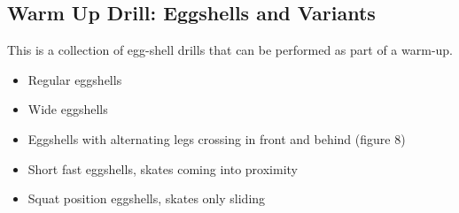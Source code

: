 \subsection*{Warm Up Drill: Eggshells and Variants}

This is a collection of egg-shell drills that can be performed as part of a warm-up. 

\begin{itemize}
    \item Regular eggshells  
    \item Wide eggshells
    \item Eggshells with alternating legs crossing in front and behind (figure 8) 
    \item Short fast eggshells, skates coming into proximity 
    \item Squat position eggshells, skates only sliding    
\end{itemize}
